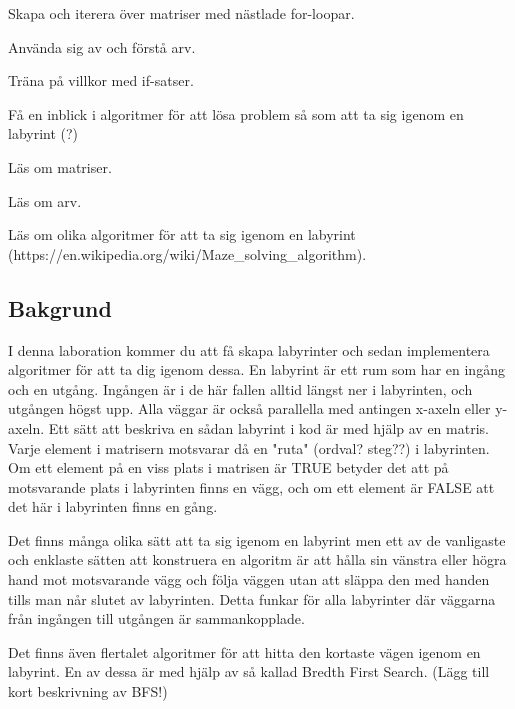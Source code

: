 

\Lab{\LabWeekNINE}

\begin{Goals}
\item Skapa och iterera över matriser med nästlade for-loopar.
\item Använda sig av och förstå arv.
\item Träna på villkor med if-satser.
\item Få en inblick i algoritmer för att lösa problem så som att ta sig igenom en labyrint (?)
\end{Goals}

\begin{Preparations}
\item Läs om matriser.
\item Läs om arv.
\item Läs om olika algoritmer för att ta sig igenom en labyrint (https://en.wikipedia.org/wiki/Maze_solving_algorithm).
\end{Preparations}

\subsection{Bakgrund}
I denna laboration kommer du att få skapa labyrinter och sedan implementera algoritmer för att ta dig igenom dessa. En labyrint är ett rum som har en ingång och en utgång. Ingången är i de här fallen alltid längst ner i labyrinten, och utgången högst upp. Alla väggar är också parallella med antingen x-axeln eller y-axeln. Ett sätt att beskriva en sådan labyrint i kod är med hjälp av en matris. Varje element i matrisern motsvarar då en "ruta" (ordval? steg??) i labyrinten. Om ett element på en viss plats i matrisen är TRUE betyder det att på motsvarande plats i labyrinten finns en vägg, och om ett element är FALSE att det här i labyrinten finns en gång.

Det finns många olika sätt att ta sig igenom en labyrint men ett av de vanligaste och enklaste sätten att konstruera en algoritm är att hålla sin vänstra eller högra hand mot motsvarande vägg och följa väggen utan att släppa den med handen tills man når slutet av labyrinten. Detta funkar för alla labyrinter där väggarna från ingången till utgången är sammankopplade.

Det finns även flertalet algoritmer för att hitta den kortaste vägen igenom en labyrint. En av dessa är med hjälp av så kallad Bredth First Search. (Lägg till kort beskrivning av BFS!)


